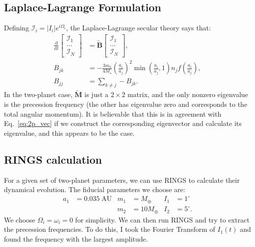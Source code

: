 \documentclass[11pt,
        usenames, %
        dvipsnames %
    ]{article}
\newcommand*{\rd}[2]{\frac{\mathrm{d}#1}{\mathrm{d}#2}}
\newcommand*{\bm}[1]{\boldsymbol{\mathbf{#1}}}
\newcommand*{\abs}[1]{\left|#1\right|}
\newcommand*{\p}[1]{\left(#1\right)}
\begin{document}
\subsection{Laplace-Lagrange Formulation}\label{ss:LL}

Defining $\mathcal{I}_i = \abs{I_i} e^{i\Omega_i}$, the Laplace-Lagrange secular
theory says that:
\begin{align}
    \rd{}{t}\begin{bmatrix}
        \mathcal{I}_1\\\dots\\\mathcal{I}_N
    \end{bmatrix}
        &= \tilde{\bm{B}} \begin{bmatrix}
            \mathcal{I}_1\\\dots\\\mathcal{I}_N
        \end{bmatrix},\\
    B_{jk} &=
        -\frac{3 m_k}{4 M_\star}\p{\frac{a_i}{a_j}}^2
            \min\p{\frac{a_i}{a_j}, 1}
            n_j f\p{\frac{a_i}{a_j}},\\
    B_{jj} &= \sum\limits_{k \neq j}
        -B_{jk}.\label{eq:2p_LL}
\end{align}
In the two-planet case, $\tilde{\bm{M}}$ is just a $2 \times 2$ matrix, and the
only nonzero eigenvalue is the precession frequency (the other has eigenvalue
zero and corresponds to the total angular momentum). It is believable that this
is in agreement with Eq.~\eqref{eq:2p_vec} if we construct the corresponding
eigenvector and calculate its eigenvalue, and this appears to be the case.

\subsection{RINGS calculation}

For a given set of two-planet parameters, we can use RINGS to calculate their
dynamical evolution. The fiducial parameters we choose are:
\begin{align}
    a_1 &= 0.035\;\mathrm{AU} & m_1 &= M_{\oplus} & I_1 &= 1^\circ\\
    && m_2 &= 10M_\oplus & I_2 &= 5^\circ.
\end{align}
We choose $\Omega_i = \omega_i = 0$ for simplicity. We can then run RINGS and
try to extract the precession frequencies. To do this, I took the Fourier
Transform of $I_1(t)$ and found the frequency with the largest amplitude.
\end{document}
